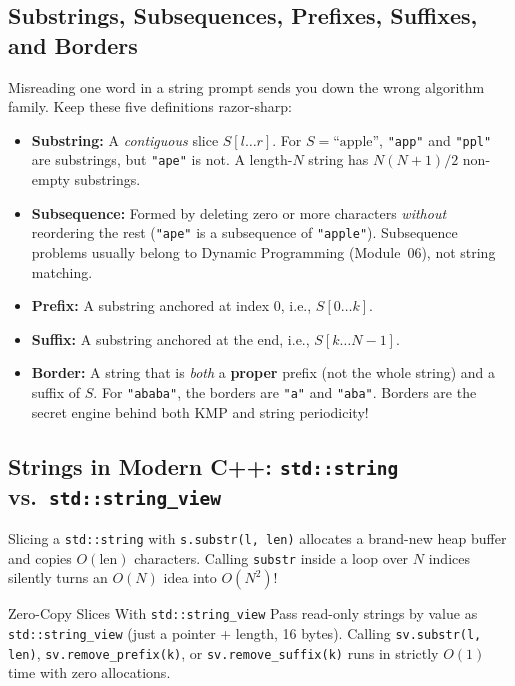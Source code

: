 \documentclass[11pt,a4paper]{article}
\theoremstyle{definition}
\begin{document}
\subsection{Substrings, Subsequences, Prefixes, Suffixes, and Borders}

Misreading one word in a string prompt sends you down the wrong algorithm family. Keep these five definitions razor-sharp:

\begin{itemize}
    \item \textbf{Substring:} A \emph{contiguous} slice $S[l \dots r]$. For $S = \text{``apple''}$, \texttt{"app"} and \texttt{"ppl"} are substrings, but \texttt{"ape"} is not. A length-$N$ string has $N(N + 1)/2$ non-empty substrings.
    \item \textbf{Subsequence:} Formed by deleting zero or more characters \emph{without} reordering the rest (\texttt{"ape"} is a subsequence of \texttt{"apple"}). Subsequence problems usually belong to Dynamic Programming (Module~06), not string matching.
    \item \textbf{Prefix:} A substring anchored at index $0$, i.e., $S[0 \dots k]$.
    \item \textbf{Suffix:} A substring anchored at the end, i.e., $S[k \dots N - 1]$.
    \item \textbf{Border:} A string that is \emph{both} a \textbf{proper} prefix (not the whole string) and a suffix of $S$. For \texttt{"ababa"}, the borders are \texttt{"a"} and \texttt{"aba"}. Borders are the secret engine behind both KMP and string periodicity!
\end{itemize}

\subsection{Strings in Modern C++: \texttt{std::string} vs.\ \texttt{std::string\_view}}

Slicing a \texttt{std::string} with \texttt{s.substr(l, len)} allocates a brand-new heap buffer and copies $O(\text{len})$ characters. Calling \texttt{substr} inside a loop over $N$ indices silently turns an $O(N)$ idea into $O(N^2)$!

\begin{calloutbox}{Zero-Copy Slices With \texttt{std::string\_view}}
Pass read-only strings by value as \texttt{std::string\_view} (just a pointer + length, 16 bytes). Calling \texttt{sv.substr(l, len)}, \texttt{sv.remove\_prefix(k)}, or \texttt{sv.remove\_suffix(k)} runs in strictly $O(1)$ time with zero allocations.
\end{calloutbox}
\end{document}
